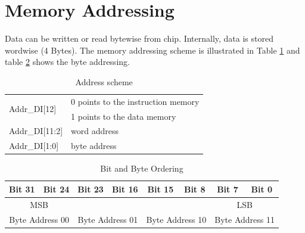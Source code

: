 
\section{Memory Addressing}
\label{sec:mem_addr}
Data can be written or read bytewise from chip. Internally, data is stored wordwise (4 Bytes). The memory addressing scheme is illustrated in Table \ref{tab:addr_scheme} and table \ref{tab:byteorder} shows the byte addressing. 
\begin{table}[htbp]
 \caption{Address scheme}
 \label{tab:addr_scheme}
\centering\begin{tabular}{|l| l|} \hline
 \multirow{2}{*}{Addr\_DI[12]} & 0 points to the instruction memory \\ 
                               & 1 points to the data memory \\ \hline
 Addr\_DI[11:2] & word address \\ \hline
 Addr\_DI[1:0] & byte address \\ \hline

 \end{tabular}
\end{table}

\begin{table}[htbp]
 \caption[Bit and Byte Ordering]{Bit and Byte Ordering \cite{or1000}}
 \label{tab:byteorder}
\centering\begin{tabular}{|c c|c c|c c|c c|} \hline
 Bit 31 & Bit 24 & Bit 23 & Bit 16 & Bit 15 & Bit 8 & Bit 7 & Bit 0 \\ \hline
\multicolumn{2}{|c|}{MSB} & & & & & \multicolumn{2}{c|}{LSB} \\ \hline
\multicolumn{2}{|c|}{Byte Address 00} & \multicolumn{2}{c|}{Byte Address 01} & \multicolumn{2}{c|}{Byte Address 10} & \multicolumn{2}{c|}{Byte Address 11} \\ \hline 

 \end{tabular}
\end{table}

